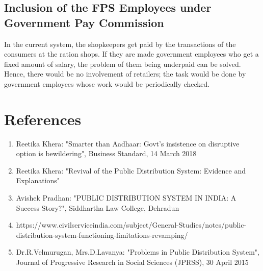 \documentclass{article}
\begin{document}
\subsection{Inclusion of the FPS Employees under Government Pay Commission}
In the current system, the shopkeepers get paid by the transactions of the consumers at the ration shops. If they are made government employees who get a fixed amount of salary, the problem of them being underpaid can be solved. Hence, there would be no involvement of retailers; the task would be done by government employees whose work would be periodically checked.
	

\section{References}
\begin{enumerate}  
\item Reetika Khera: "Smarter than Aadhaar: Govt's insistence on
disruptive option is bewildering", Business Standard, 14 March 2018
\item Reetika Khera: "Revival of the Public Distribution System:
Evidence and Explanations"
\item Avishek Pradhan: "PUBLIC DISTRIBUTION SYSTEM IN INDIA: A Success Story?", Siddhartha Law College, Dehradun
\item https://www.civilserviceindia.com/subject/General-Studies/notes/public-distribution-system-functioning-limitations-revamping/
\item Dr.R.Velmurugan, Mrs.D.Lavanya: "Problems in Public Distribution System", Journal of Progressive Research in Social Sciences (JPRSS), 30 April 2015
\end{enumerate}
\end{document}
